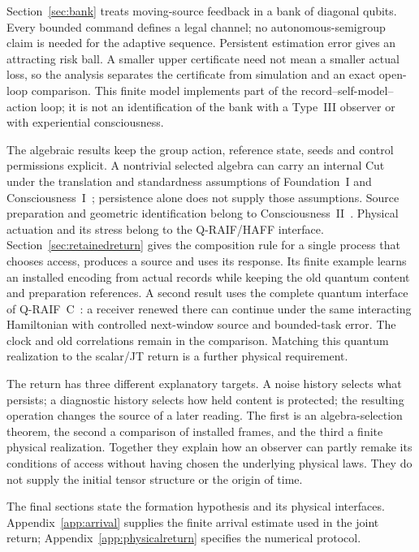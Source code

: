 \documentclass[12pt]{article}
\theoremstyle{definition}
\theoremstyle{remark}
\begin{document}
Section~\ref{sec:bank} treats moving-source feedback in a bank of
diagonal qubits. Every bounded command defines a legal channel; no
autonomous-semigroup claim is needed for the adaptive sequence.
Persistent estimation error gives an attracting risk ball.
A smaller upper certificate need not mean a smaller actual loss, so
the analysis separates the certificate from simulation and an exact
open-loop comparison. This finite model implements part of the
record--self-model--action loop; it is not an identification of the
bank with a Type~III observer or with experiential consciousness.

The algebraic results keep the group action, reference state, seeds and
control permissions explicit. A nontrivial selected algebra can carry
an internal Cut under the translation and standardness assumptions of
Foundation~I and Consciousness~I~\cite{PaperI}; persistence alone does
not supply those assumptions. Source preparation and geometric
identification belong to Consciousness~II~\cite{PaperII}.
Physical actuation and its stress belong to the Q-RAIF/HAFF interface.
Section~\ref{sec:retainedreturn} gives the composition rule for a
single process that chooses access, produces a source and uses its
response. Its finite example learns an installed encoding from actual
records while keeping the old quantum content and preparation
references. A second result uses the complete quantum interface of
Q-RAIF~C~\cite{QRAIFC}: a receiver renewed there can continue under
the same interacting Hamiltonian with controlled next-window source
and bounded-task error. The clock and old correlations remain in the
comparison. Matching this quantum realization to the scalar/JT return
is a further physical requirement.

The return has three different explanatory targets. A noise history
selects what persists; a diagnostic history selects how held content is
protected; the resulting operation changes the source of a later reading.
The first is an algebra-selection theorem, the second a comparison of
installed frames, and the third a finite physical realization.
Together they explain how an observer can partly remake its conditions
of access without having chosen the underlying physical laws.
They do not supply the initial tensor structure or the origin of time.

The final sections state the formation hypothesis and its physical
interfaces. Appendix~\ref{app:arrival} supplies the finite arrival
estimate used in the joint return; Appendix~\ref{app:physicalreturn}
specifies the numerical protocol.
\end{document}
